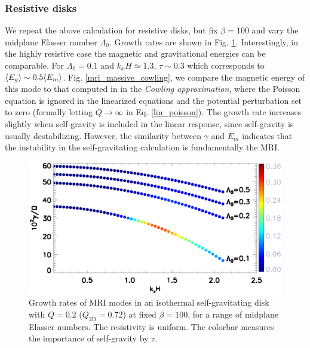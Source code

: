 \subsubsection{Resistive disks}
We repeat the above calculation for resistive disks, but fix
$\beta=100$ and vary the midplane Elasser number $\Lambda_0$. Growth
rates are shown in Fig. \ref{gravity_energy_resis}. 
Interestingly, in the highly resistive case
the magnetic and gravitational energies can be comparable. For 
$\Lambda_0=0.1$ and $k_xH\simeq1.3$, $\tau\sim 0.3$ which corresponds
to $\langle{E_g}\rangle\sim 0.5\langle{E_m}\rangle$.  
Fig. \ref{mri_massive_cowling}, we compare the magnetic
energy of this mode to that computed in in the \emph{Cowling  
  approximation}, where the Poisson equation is ignored in the 
linearized equations and the potential perturbation set to zero  
(formally letting $Q\to\infty$ in Eq. \ref{lin_poisson}).  
The growth rate increases slightly when self-gravity is included in the linear
response, since self-gravity is usually destabilizing. However, the
similarity between $\gamma$ and $E_m$ indicates that the instability
in the self-gravitating calculation is fundamentally the MRI.   

\begin{figure}
  \includegraphics[width=\linewidth]{figures/compare_energy_resis}
  \caption{
    Growth rates of MRI modes in an isothermal self-gravitating
    disk with $Q=0.2$ ($Q_\mathrm{2D}=0.72$) at fixed $\beta=100$, 
    for a range of midplane Elasser numbers. The resistivity is
    uniform. The colorbar measures the importance of self-gravity by $\tau$. 
    \label{gravity_energy_resis}}
\end{figure}


